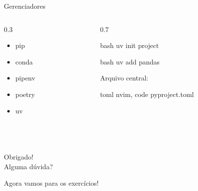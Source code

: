 \documentclass[xcolor=dvipsnames,t,aspectratio=169]{beamer}
\newcommand{\highlight}[1]{{\color{nes_dark_orange} #1}}
\begin{document}
\begin{frame}[c, fragile]{Gerenciadores}

    \begin{columns}

        \begin{column}{0.3\textwidth}
            \begin{itemize}

            \item pip
            \item conda
            \item pipenv
            \item poetry
            \item uv
            \end{itemize}
        \end{column}

        \begin{column}{0.7\textwidth}
            \begin{code}{bash}
            uv init project
            \end{code}

            \begin{code}{bash}
            uv add pandas
            \end{code}

            Arquivo central:

            \begin{code}[Config]{toml}
            {nvim, code} pyproject.toml
            \end{code}
        \end{column}
    \end{columns}


\end{frame}



\begin{frame}
    \frametitle{~}
        \vfill
        \begin{center}
            {\Huge Obrigado!}\vspace{1.5em}\\
            {\Large \highlight{Alguma dúvida?}}\\
        \end{center}
        \vfill
        \begin{center}
            {\small Agora vamos para os exercícios!}
        \end{center}
\end{frame}
\end{document}

